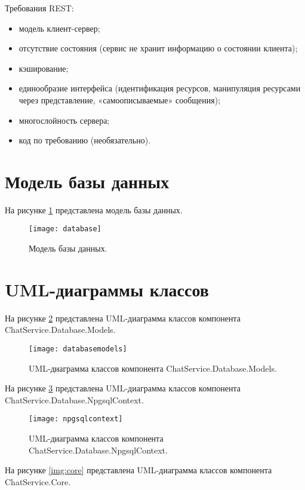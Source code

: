 Требования REST:
\begin{itemize}
\item модель клиент-сервер;
\item отсутствие состояния (сервис не хранит информацию о состоянии клиента);
\item кэширование;
\item единообразие интерфейса (идентификация ресурсов, манипуляция ресурсами через представление, «самоописываемые» сообщения);
\item многослойность сервера;
\item код по требованию (необязательно). 
\end{itemize}

\section{\textbf{Модель базы данных}}

На рисунке \ref{img:database} представлена модель базы данных. 

\begin{figure}[H]
	\centering
	\texttt{[image: database]}
	\caption{Модель базы данных. }
	\label{img:database}
\end{figure}

\section{\textbf{UML-диаграммы классов }}

На рисунке \ref{img:databasemodels} представлена UML-диаграмма классов компонента ChatService.Database.Models. 

\begin{figure}[H]
	\centering
	\texttt{[image: databasemodels]}
	\caption{UML-диаграмма классов компонента ChatService.Database.Models. }
	\label{img:databasemodels}
\end{figure}

На рисунке \ref{img:npgsqlcontext} представлена UML-диаграмма классов компонента ChatService.Database.NpgsqlContext. 

\begin{figure}[H]
	\centering
	\texttt{[image: npgsqlcontext]}
	\caption{UML-диаграмма классов компонента ChatService.Database.NpgsqlContext. }
	\label{img:npgsqlcontext}
\end{figure}

На рисунке \ref{img:core} представлена UML-диаграмма классов компонента ChatService.Core. 

